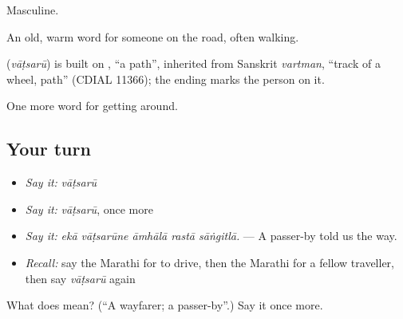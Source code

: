 Masculine.

An old, warm word for someone on the road, often walking.

\begin{cousinweb}
\textbf{} (\emph{vāṭsarū}) is built on \textbf{}, \textquotedblleft{}a path\textquotedblright{}, inherited from Sanskrit \emph{vartman}, \textquotedblleft{}track of a wheel, path\textquotedblright{} (CDIAL 11366); the ending marks the person on it.
\end{cousinweb}

\begin{grammarlens}[title={What you've built}]
One more word for getting around.
\end{grammarlens}

\subsection*{Your turn}
\begin{itemize}
\raggedright
  \item \emph{Say it:} \emph{vāṭsarū}
  \item \emph{Say it:} \emph{vāṭsarū}, once more
  \item \emph{Say it:} \emph{ekā vāṭsarūne āmhālā rastā sāṅgitlā.} — A passer-by told us the way.
  \item \emph{Recall:} say the Marathi for to drive, then the Marathi for a fellow traveller, then say \emph{vāṭsarū} again
\end{itemize}

\begin{tcolorbox}[breakable,colback=teal!4,colframe=teal!35!black,title={Before you move on}]
What does  mean? (\textquotedblleft{}A wayfarer; a passer-by\textquotedblright{}.) Say it once more.
\end{tcolorbox}
